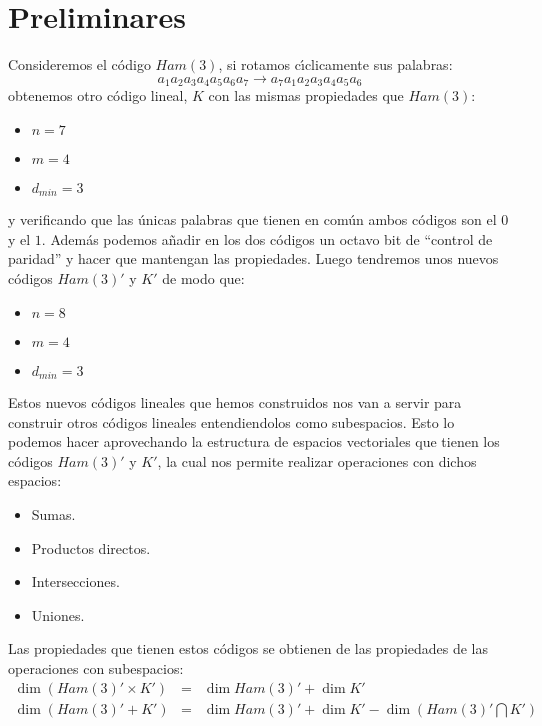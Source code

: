 %
%

\section{Preliminares}

Consideremos el c\'odigo $Ham(3)$, si rotamos c\'{\i}clicamente sus palabras:
\begin{displaymath}
a_1a_2a_3a_4a_5a_6a_7\rightarrow a_7a_1a_2a_3a_4a_5a_6
\end{displaymath}
obtenemos otro c\'odigo lineal, $K$ con las mismas propiedades que $Ham(3)$:
\begin{itemize}
\item $n=7$
\item $m=4$
\item $d_{min}=3$ 
\end{itemize}
y verificando que las \'unicas palabras que tienen en com\'un ambos c\'odigos
son el $0$ y el $1$.
%
\newpage
%
Adem\'as podemos a\~nadir en los dos c\'odigos un octavo bit de ``control de
paridad'' y hacer que mantengan las propiedades. Luego tendremos unos nuevos
c\'odigos $Ham(3)'$ y $K'$ de modo que:
\begin{itemize}
\item $n=8$
\item $m=4$
\item $d_{min}=3$
\end{itemize}

Estos nuevos c\'odigos lineales que hemos construidos nos van a servir para
construir otros c\'odigos lineales entendiendolos como subespacios. Esto lo
podemos hacer aprovechando la estructura de espacios vectoriales que tienen
los c\'odigos $Ham(3)'$ y $K'$, la cual nos permite realizar operaciones con
dichos espacios:
\begin{itemize}
\item Sumas.
\item Productos directos.
\item Intersecciones.
\item Uniones.
\end{itemize}

Las propiedades que tienen estos c\'odigos se obtienen de las propiedades de las
operaciones con subespacios:
\begin{eqnarray*}
\dim (Ham(3)'\times K')&=&\dim Ham(3)'+\dim K'\\
\dim (Ham(3)'+K')&=&\dim Ham(3)'+\dim K' -\dim (Ham(3)'\bigcap K')
\end{eqnarray*}
